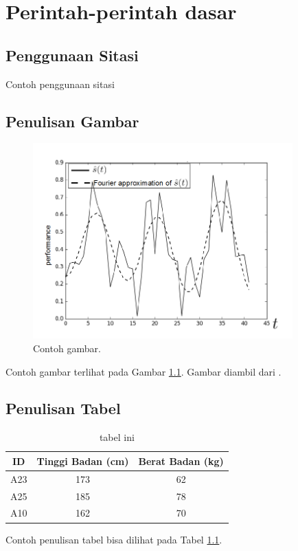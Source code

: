 \chapter{Perintah-perintah dasar}


\section{Penggunaan Sitasi}
Contoh penggunaan sitasi \cite{lukito2016,santosa2011user}
\cite{setiawan2014fuzzy} \cite{wibowo2014line} \cite{marenda2016digitory} \cite{wibirama2013dual,wibowo2016clustering}

\section{Penulisan Gambar}

\begin{figure}[h]
	\centering
	\includegraphics[width=10cm]{contents/chapter-1/sample-fig.png}
	\caption{Contoh gambar.}
	\label{Fig: Contoh gambar}
\end{figure}

Contoh gambar terlihat pada Gambar \ref{Fig: Contoh gambar}. Gambar diambil dari \cite{wibowo2016clustering}.

\section{Penulisan Tabel}
\begin{table}[h]
	\caption{tabel ini}
	\vspace{0.5em}
	\centering
	\begin{tabular}{|c|c|c|}
		\hline
		ID & Tinggi Badan (cm) & Berat Badan (kg) \\
		\hline \hline
		A23 & 173 & 62 \\
		A25 & 185 & 78 \\
		A10 & 162 & 70 \\ \hline
	\end{tabular}
	\label{Tab: Tabel Tinggi Berat}
\end{table}
Contoh penulisan tabel bisa dilihat pada Tabel \ref{Tab: Tabel Tinggi Berat}.

